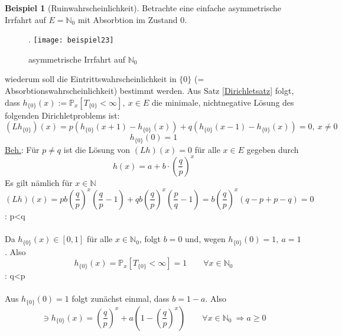 \documentclass[a4paper,12pt]{scrartcl}
\theoremstyle{definition}
\newtheorem{bsp}{Beispiel}[section]
\begin{document}
\begin{bsp}[Ruinwahrscheinlichkeit]
Betrachte eine einfache asymmetrische Irrfahrt auf $E = \mathbb{N}_{0}$ mit Absorbtion im Zustand 0.
\begin{figure}[H].
\centering
\texttt{[image: beispiel23]}
\caption{asymmetrische Irrfahrt auf $\mathbb{N}_{0}$}
\end{figure}
\noindent
wiederum soll die Eintrittswahrscheinlichkeit in $\lbrace 0 \rbrace$ (= Absorbtionswahrscheinlichkeit) bestimmt werden. Aus Satz \ref{Dirichletsatz} folgt, dass $h_{\lbrace 0 \rbrace}(x) := \mathbb{P}_{x}[T_{\lbrace 0 \rbrace} < \infty], \: x \in E$ die minimale, nichtnegative Lösung des folgenden Dirichletproblems ist:
\begin{equation*}
(Lh_{\lbrace 0 \rbrace})(x) = p(h_{\lbrace 0 \rbrace}(x+1) - h_{\lbrace 0 \rbrace}(x)) + q(h_{\lbrace 0 \rbrace}(x-1) - h_{\lbrace 0 \rbrace}(x)) = 0, \: x \neq 0
\end{equation*}
\begin{equation*}
h_{\lbrace 0 \rbrace}(0) = 1
\end{equation*}
\underline{Beh.}: Für $p \neq q$ ist die Lösung von $(Lh)(x) = 0$ für alle $x \in E$ gegeben durch
\begin{equation*}
h(x) = a + b \cdot (\dfrac{q}{p})^{x}
\end{equation*}
Es gilt nämlich für $x \in \mathbb{N}$
\begin{equation*}
(Lh)(x) = pb (\dfrac{q}{p})^{x}(\dfrac{q}{p} - 1) + qb (\dfrac{q}{p})^{x} (\dfrac{p}{q} - 1) = b (\dfrac{q}{p})^{x}(q-p + p-q) = 0
\end{equation*}
: p<q
\\
\\
Da $h_{\lbrace 0 \rbrace}(x) \in [0,1]$ für alle $x \in \mathbb{N}_{0}$, folgt $b=0$ und, wegen $h_{\lbrace 0 \rbrace}(0) = 1, \: a=1$. Also
\begin{equation*}
h_{\lbrace 0 \rbrace}(x) = \mathbb{P}_{x}[T_{\lbrace 0 \rbrace} < \infty] = 1 \qquad \forall x \in \mathbb{N}_{0}
\end{equation*}
: q<p
\\
\\
Aus $h_{\lbrace 0 \rbrace}(0) = 1$ folgt zunächst einmal, dass $b = 1-a$. Also
\begin{equation*}
[0,1] \ni h_{\lbrace 0 \rbrace}(x) = (\dfrac{q}{p})^{x} + a(1- (\dfrac{q}{p})^{x}) \qquad \forall x \in \mathbb{N}_{0} \: \Rightarrow a \geq 0
\end{equation*}

\end{bsp}
\end{document}
